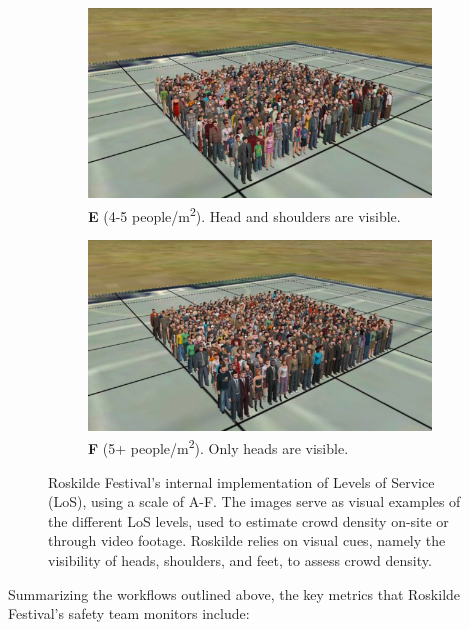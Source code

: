 \begin{figure}
  \begin{subfigure}[t]{0.45\textwidth}
    \centering
    \includegraphics[width=\textwidth]{Pictures/Figures/Los/E.png}
    \caption*{\textbf{E} (4-5 people/m\textsuperscript{2}). Head and shoulders are visible.}
  \end{subfigure}%
  \hspace{0.06\textwidth}
  \begin{subfigure}[t]{0.45\textwidth}
    \centering
    \includegraphics[width=\textwidth]{Pictures/Figures/Los/F.png}
    \caption*{\textbf{F} (5+ people/m\textsuperscript{2}). Only heads are visible.}
  \end{subfigure}
  \caption{Roskilde Festival's internal implementation of Levels of Service (LoS), using a scale of A-F. The images serve as visual examples of the different LoS levels, used to estimate crowd density on-site or through video footage. Roskilde relies on visual cues, namely the visibility of heads, shoulders, and feet, to assess crowd density.}
\end{figure}

Summarizing the workflows outlined above, the key metrics that Roskilde Festival's safety team monitors include:

